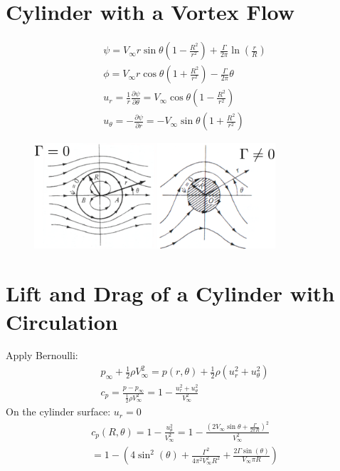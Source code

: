 \documentclass[class=report, crop=false, 12pt,a4paper]{standalone}
\begin{document}
\section{Cylinder with a Vortex Flow}
\begin{gather}
  \psi = V_{\infty}r\sin\theta\left(1-\frac{R^2}{r^2}\right) + \frac{\Gamma}{2\pi}\ln\left(\frac{r}{R}\right)\\
  \phi = V_{\infty}r\cos\theta\left(1+\frac{R^2}{r^2}\right)-\frac{\Gamma}{2\pi}\theta\\
  u_r = \frac{1}{r}\frac{\partial \psi}{\partial \theta} = V_{\infty}\cos\theta\left(1-\frac{R^2}{r^2}\right)\\
  u_{\theta} = -\frac{\partial \psi}{\partial r} = - V_{\infty}\sin\theta\left(1+\frac{R^2}{r^2}\right)
\end{gather}
\begin{figure}[H]
  \centering
  \includegraphics[width = 0.8\textwidth]{../img/diagram25.png}
\end{figure}
\section{Lift and Drag of a Cylinder with Circulation}
Apply Bernoulli:
\begin{gather}
  p_{\infty} + \frac{1}{2}\rho V_{\infty}^2 = p(r,\theta) + \frac{1}{2}\rho(u_r^2+u_{\theta}^2)\\
  c_p = \frac{p - p_{\infty}}{\frac{1}{2}\rho V_{\infty}^2} = 1 - \frac{u_r^2 + u_{\theta}^2}{V_{\infty}^2}
\end{gather}
On the cylinder surface: $u_r = 0$
\begin{gather}
  c_p (R,\theta) = 1 - \frac{u_{\theta}^2}{V_{\infty}^2}=1-\frac{(2V_{\infty}\sin\theta + \frac{\Gamma}{2\pi R})^2}{V_{\infty}^2} \\
  = 1-\left(4\sin^2(\theta)+\frac{\Gamma^2}{4\pi^2V_{\infty}^2R^2}+\frac{2\Gamma\sin(\theta)}{V_{\infty}\pi R}\right)
\end{gather}
\end{document}
